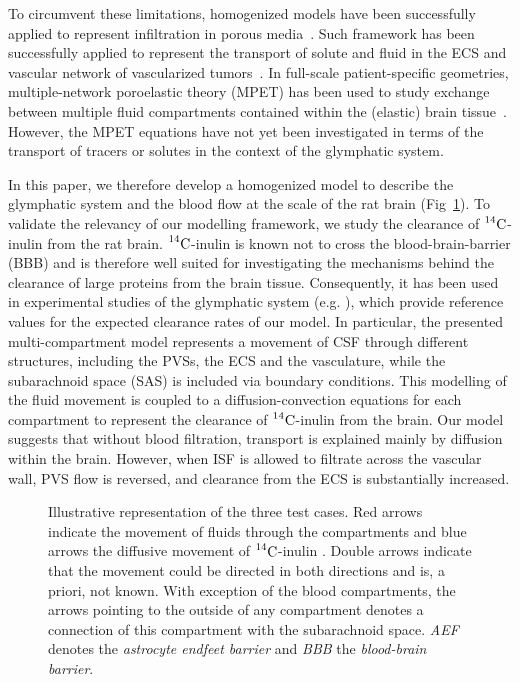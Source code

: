 \documentclass[a4paper,11pt]{article}
\newcommand{\1}{^{(1)}}
\newcommand{\2}{^{(2)}}
\newcommand{\Cinulin}{$\prescript{14}{}{\text{C}}$-inulin }
\begin{document}
To circumvent these limitations, homogenized models have been successfully applied to represent infiltration in porous media~\cite{Hornung-1996-homogenization}. Such framework has been successfully applied to represent the transport of solute and fluid in the ECS and vascular network of vascularized tumors~\cite{ shipley_multiscale_2010,shipley-four-comp, Penta-homogenization-2015}.   
In full-scale patient-specific geometries, multiple-network poroelastic theory (MPET) has been used to study exchange between multiple fluid compartments contained within the (elastic) brain tissue~\cite{Biot-1941-Consolidation,Biot-1955-Consolidation2, Bai-MPET-1993,tully_ventikos_2011,Vardakis-2016-cerebral,Guo-2018-MPET,Guo-2019-MPET}. However, the MPET equations have not yet been investigated in terms of the transport of tracers or solutes in the context of the glymphatic system.


In this paper, we therefore develop a homogenized model to describe the glymphatic system and the blood flow at the scale of the rat brain (Fig~\ref{fig:multi-comp}). To validate the relevancy of our modelling framework, we study the clearance of \Cinulin from the rat brain. \Cinulin is known not to cross the blood-brain-barrier (BBB) and is therefore well suited for investigating the mechanisms behind the clearance of large proteins from the brain tissue. Consequently, it has been used in experimental studies of the glymphatic system (e.g. \cite{Xie_2013_sleep, groothuis2007efflux}), which provide reference values for the expected clearance rates of our model. In particular, the presented multi-compartment model represents a movement of CSF through different structures, including the PVSs, the ECS and the vasculature, while the subarachnoid space (SAS) is included via boundary conditions. This modelling of the fluid movement is coupled to a diffusion-convection equations for each compartment to represent the clearance of \Cinulin from the brain. Our model suggests that without blood filtration, transport is explained mainly by diffusion within the brain. However, when ISF is allowed to filtrate across the vascular wall, PVS flow is reversed, and clearance from the ECS is substantially increased. 


\begin{figure}
\centering
  \caption{Illustrative representation of the three test cases. Red arrows indicate the movement of fluids through the compartments and blue arrows the diffusive movement of \Cinulin. Double arrows indicate that the movement could be directed in both directions and is, a priori, not known. With exception of the blood compartments, the arrows pointing to the outside of any compartment denotes a connection of this compartment with the subarachnoid space. \textit{AEF} denotes the \textit{astrocyte endfeet barrier} and \textit{BBB} the \textit{blood-brain barrier}.  }
\label{fig:multi-comp}
\end{figure}
\end{document}
